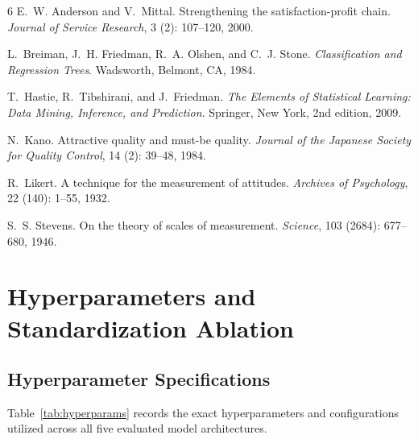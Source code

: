 \documentclass[10pt,a4paper]{article}
\begin{document}

\begin{thebibliography}{6}
E.~W. Anderson and V.~Mittal.
\newblock Strengthening the satisfaction-profit chain.
\newblock \emph{Journal of Service Research}, 3 (2): 107--120, 2000.

L.~Breiman, J.~H. Friedman, R.~A. Olshen, and C.~J. Stone.
\newblock \emph{Classification and Regression Trees}.
\newblock Wadsworth, Belmont, CA, 1984.

T.~Hastie, R.~Tibshirani, and J.~Friedman.
\newblock \emph{The Elements of Statistical Learning: Data Mining, Inference, and Prediction}.
\newblock Springer, New York, 2nd edition, 2009.

N.~Kano.
\newblock Attractive quality and must-be quality.
\newblock \emph{Journal of the Japanese Society for Quality Control}, 14 (2): 39--48, 1984.

R.~Likert.
\newblock A technique for the measurement of attitudes.
\newblock \emph{Archives of Psychology}, 22 (140): 1--55, 1932.

S.~S. Stevens.
\newblock On the theory of scales of measurement.
\newblock \emph{Science}, 103 (2684): 677--680, 1946.
\end{thebibliography}

\appendix
\section{Hyperparameters and Standardization Ablation}
\label{sec:appendix}

\subsection{Hyperparameter Specifications}
Table~\ref{tab:hyperparams} records the exact hyperparameters and configurations utilized across all five evaluated model architectures.
\end{document}
